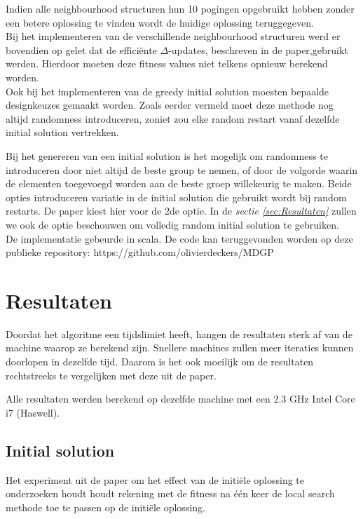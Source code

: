 \documentclass[pdftex,12pt,a4paper]{article}
\begin{document}
Indien alle neighbourhood structuren hun 10 pogingen opgebruikt hebben zonder een betere oplossing te vinden wordt de huidige oplossing teruggegeven.
\\[1em]
Bij het implementeren van de verschillende neighbourhood structuren werd er bovendien op gelet dat de effici\"ente $\Delta$-updates, beschreven in de paper,gebruikt werden. Hierdoor moeten deze fitness values niet telkens opnieuw berekend worden.
\\[1em]
Ook bij het implementeren van de greedy initial solution moesten bepaalde designkeuzes gemaakt worden. Zoals eerder vermeld moet deze methode nog altijd randomness introduceren, zoniet zou elke random restart vanaf dezelfde initial solution vertrekken.
 
Bij het genereren van een initial solution is het mogelijk om randomness te introduceren door niet altijd de beste group te nemen, of door de volgorde waarin de elementen toegevoegd worden aan de beste groep willekeurig te maken. Beide opties introduceren variatie in de initial solution die gebruikt wordt bij random restarts. De paper kiest hier voor de 2de optie. In de \emph{sectie \ref{sec:Resultaten}} zullen we ook de optie beschouwen om volledig random initial solution te gebruiken.
\\[1em]
De implementatie gebeurde in scala. De code kan teruggevonden worden op deze publieke repository: https://github.com/olivierdeckers/MDGP

 
\section{Resultaten \label{sec:Resultaten}}
Doordat het algoritme een tijdslimiet heeft, hangen de resultaten sterk af van de machine waarop ze berekend zijn. Snellere machines zullen meer iteraties kunnen doorlopen in dezelfde tijd. Daarom is het ook moeilijk om de resultaten rechtstreeks te vergelijken met deze uit de paper.

Alle resultaten werden berekend op dezelfde machine met een 2.3 GHz Intel Core i7 (Haswell).


\subsection{Initial solution}
Het experiment uit de paper om het effect van de initi\"ele oplossing te onderzoeken houdt houdt rekening met de fitness na \'e\'en keer de local search methode toe te passen op de initi\"ele oplossing.
\end{document}
